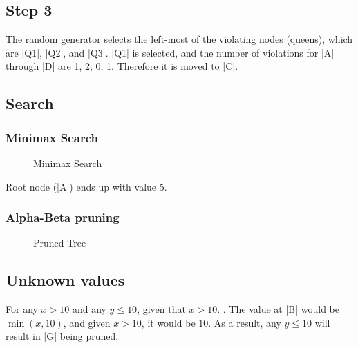 \documentclass{homework}
\begin{document}
\subsection{Step 3}
The random generator selects the left-most of the violating nodes (queens), which are \cverb|Q1|, \cverb|Q2|, and \cverb|Q3|.
\cverb|Q1| is selected, and the number of violations for \cverb|A| through \cverb|D| are 1, 2, 0, 1. Therefore it is moved to \cverb|C|.

\clearpage
\exercise[4]

\subsection{Search}
\subsubsection{Minimax Search}
\begin{figure}[h!]
    \centering
    
    \caption{Minimax Search}
    \label{fig:q41}
\end{figure}
Root node (\cverb|A|) ends up with value 5.

\subsubsection{Alpha-Beta pruning}
\begin{figure}[h!]
    \centering
    
    \caption{Pruned Tree}
    \label{fig:q42}
\end{figure}

\subsection{Unknown values}
For any $x > 10$ and any $y \leq 10$, given that $x > 10$.
.
The value at \cverb|B| would be $\min(x, 10)$, and given $x > 10$, it would be $10$. As a result, any $y \leq 10$ will result in \cverb|G| being pruned.

\clearpage
\end{document}

